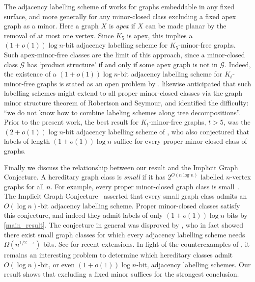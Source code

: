 \documentclass[twoside,leqno]{article}
\newcommand{\defin}[1]{\emph{\textcolor{brightmaroon}{#1}}}
\begin{document}
The adjacency labelling scheme of \citet{dujmovic.esperet.ea:adjacency} works for  graphs embeddable in any fixed surface, and more generally for any minor-closed class excluding a fixed apex graph as a minor. Here a graph $X$ is \defin{apex} if $X$ can be made planar by the removal of at most one vertex. Since $K_5$ is apex, this implies a $(1+o(1))\log n$-bit adjacency labelling scheme for $K_5$-minor-free graphs. Such apex-minor-free classes are the limit of this approach, since a minor-closed class $\mathcal{G}$ has `product structure' if and only if some apex graph is not in $\mathcal{G}$. Indeed, the existence of a $(1+o(1))\log n$-bit adjacency labelling scheme for $K_t$-minor-free graphs is stated as an open problem by \citet[Section~6, Problem~2]{dujmovic.esperet.ea:adjacency}. \citet{BGP22} likewise anticipated that such labelling schemes might extend to all proper minor-closed classes via the graph minor structure theorem of Robertson and Seymour, and identified the difficulty: ``we do not know how to combine labeling schemes along tree decompositions''.
 Prior to the present work, the best result for $K_t$-minor-free graphs, $t > 5$, was the $(2+o(1))\log n$-bit adjacency labelling scheme of \citet{gavoille.labourel:shorter}, who also conjectured that labels of length $(1+o(1))\log n$ suffice for
every proper minor-closed class of graphs.



Finally we discuss the relationship between our result and the Implicit Graph Conjecture. A hereditary graph class is \defin{small} if it has $2^{O(n\log n)}$ labelled $n$-vertex graphs for all $n$. For example, every proper minor-closed graph class is small~\citep{NSTW06}. The Implicit Graph Conjecture~\citep{kannan.naor.ea:implicit} asserted that every small graph class admits an $O(\log n)$-bit adjacency labelling scheme. Proper minor-closed classes satisfy this conjecture, and indeed they admit labels of only $(1+o(1))\log n$ bits by \cref{main_result}. The conjecture in general was disproved by \citet{HH22}, who in fact showed there exist small graph classes for which every adjacency labelling scheme needs $\Omega(n^{1/2-\epsilon})$ bits. See \citep{Bonnet-etal-ICALP24,Bonnet-etal-SJC24,Alon24} for recent extensions. In light of the counterexamples of \cite{HH22}, it remains an interesting problem to determine which hereditary classes admit $O(\log n)$-bit, or even $(1+o(1))\log n$-bit, adjacency labelling schemes. Our result shows that excluding a fixed minor suffices for the strongest conclusion.
\end{document}
